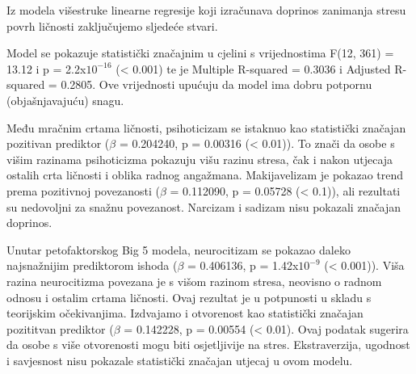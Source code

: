 \documentclass[
]{article}
\begin{document}
Iz modela višestruke linearne regresije koji izračunava doprinos
zanimanja stresu povrh ličnosti zaključujemo sljedeće stvari.

Model se pokazuje statistički značajnim u cjelini s vrijednostima F(12,
361) = 13.12 i p = 2.2x\(10^{-16}\) (\textless{} 0.001) te je Multiple
R-squared = 0.3036 i Adjusted R-squared = 0.2805. Ove vrijednosti
upućuju da model ima dobru potpornu (objašnjavajuću) snagu.

Među mračnim crtama ličnosti, psihoticizam se istaknuo kao statistički
značajan pozitivan prediktor (\(\beta\) = 0.204240, p = 0.00316
(\textless{} 0.01)). To znači da osobe s višim razinama psihoticizma
pokazuju višu razinu stresa, čak i nakon utjecaja ostalih crta ličnosti
i oblika radnog angažmana. Makijavelizam je pokazao trend prema
pozitivnoj povezanosti (\(\beta\) = 0.112090, p = 0.05728 (\textless{}
0.1)), ali rezultati su nedovoljni za snažnu povezanost. Narcizam i
sadizam nisu pokazali značajan doprinos.

Unutar petofaktorskog Big 5 modela, neurocitizam se pokazao daleko
najsnažnijim prediktorom ishoda (\(\beta\) = 0.406136, p =
1.42x\(10^{-9}\) (\textless{} 0.001)). Viša razina neurocitizma povezana
je s višom razinom stresa, neovisno o radnom odnosu i ostalim crtama
ličnosti. Ovaj rezultat je u potpunosti u skladu s teorijskim
očekivanjima. Izdvajamo i otvorenost kao statistički značajan pozititvan
prediktor (\(\beta\) = 0.142228, p = 0.00554 (\textless{} 0.01). Ovaj
podatak sugerira da osobe s više otvorenosti mogu biti osjetljivije na
stres. Ekstraverzija, ugodnost i savjesnost nisu pokazale statistički
značajan utjecaj u ovom modelu.
\end{document}
